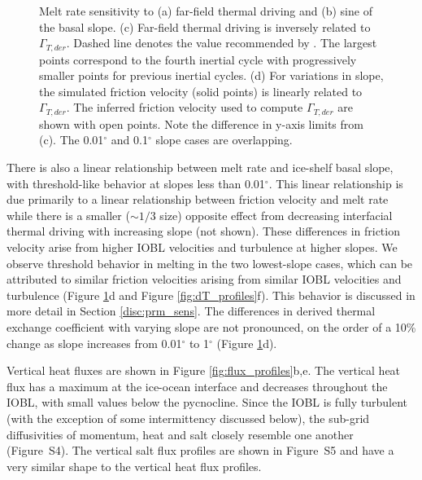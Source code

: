 \documentclass[draft]{styles/agujournal2019}
\begin{document}
\begin{figure}[h!]
\begin{minipage}{0.5\textwidth}
    \end{minipage}
    \caption{Melt rate sensitivity to (a) far-field thermal driving and (b) sine of the basal slope. (c) Far-field thermal driving is inversely related to $\Gamma_{T,der}$. Dashed line denotes the value recommended by . The largest points correspond to the fourth inertial cycle with progressively smaller points for previous inertial cycles. (d) For variations in slope, the simulated friction velocity (solid points) is linearly related to $\Gamma_{T,der}$. The inferred friction velocity used to compute $\Gamma_{T,der}$ are shown with open points. Note the difference in y-axis limits from (c). The 0.01$^{\circ}$ and 0.1$^{\circ}$ slope cases are overlapping.}
    \label{fig:melt_sensitivity}
\end{figure}

There is also a linear relationship between melt rate and ice-shelf basal slope, with threshold-like behavior at slopes less than 0.01$^{\circ}$. This linear relationship is due primarily to a linear relationship between friction velocity and melt rate while there is a smaller ($\sim\!1/3$ size) opposite effect from decreasing interfacial thermal driving with increasing slope (not shown). These differences in friction velocity arise from higher IOBL velocities and turbulence at higher slopes. We observe threshold behavior in melting in the two lowest-slope cases, which can be attributed to similar friction velocities arising from similar IOBL velocities and turbulence (Figure \ref{fig:melt_sensitivity}d and Figure \ref{fig:dT_profiles}f). This behavior is discussed in more detail in Section \ref{disc:prm_sens}. The differences in derived thermal exchange coefficient with varying slope are not pronounced, on the order of a 10\% change as slope increases from 0.01$^{\circ}$ to 1$^{\circ}$ (Figure \ref{fig:melt_sensitivity}d).  

Vertical heat fluxes are shown in Figure \ref{fig:flux_profiles}b,e. The vertical heat flux has a maximum at the ice-ocean interface and decreases throughout the IOBL, with small values below the pycnocline. Since the IOBL is fully turbulent (with the exception of some intermittency discussed below), the sub-grid diffusivities of momentum, heat and salt closely resemble one another (Figure~S4). The vertical salt flux profiles are shown in Figure~S5 and have a very similar shape to the vertical heat flux profiles.
\end{document}
